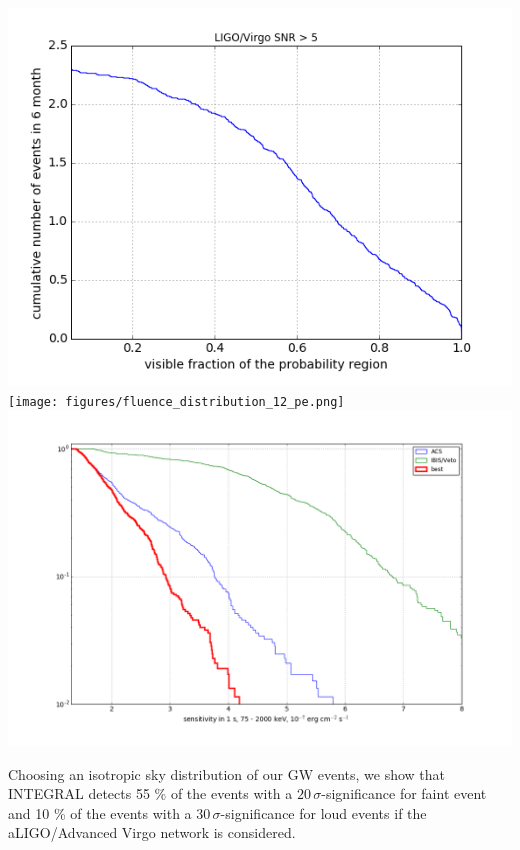 \documentclass[a0,portrait]{a0poster}
\begin{document}
\begin{multicols}{2}
\begin{center}\vspace{.5cm}
    \includegraphics[scale=.6]{figures/covered_region.png}\texttt{[image: figures/fluence\_distribution\_12\_pe.png]}\includegraphics[scale=.37]{figures/sensitivity_distribution_pe.png}
    \label{covered_region}
\end{center}

Choosing an isotropic sky distribution of our GW events, we show that INTEGRAL
detects 55 \% of the events with a $20 \, \sigma$-significance for faint event
and 10 \% of the events with a $30 \, \sigma$-significance for loud events if
the aLIGO/Advanced Virgo network is considered.


\end{multicols}
\end{document}
